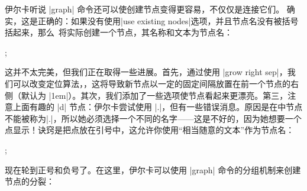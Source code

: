 伊尔卡听说 |graph| 命令还可以使创建节点变得更容易，不仅仅是连接它们。 确实，这是正确的：如果没有使用|use existing nodes|选项，并且节点名没有被括号括起来，那么\tikzname\ 将实际创建一个节点，其名称和文本为节点名：

%
\begin{codeexample}[preamble={\usetikzlibrary{graphs}}]
\tikz {};
\end{codeexample}
%

这并不太完美，但我们正在取得一些进展。首先，通过使用 |grow right sep|，我们可以改变定位算法，，这将导致新节点以一定的固定间隔放置在前一个节点的右侧（默认为 |1em|）。其次，我们添加了一些选项使节点看起来更漂亮。第三，注意上面有趣的 |d| 节点：伊尔卡尝试使用 |.|，但有一些错误消息。原因是在\tikzname 中节点不能被称为|.|，所以她必须选择一个不同的名字——这是不好的，因为她想要一个点显示！诀窍是把点放在引号中，这允许你使用``相当随意的文本''作为节点名：

%
\begin{codeexample}[preamble={\usetikzlibrary{graphs,shapes.misc}}]
\tikz {};
\end{codeexample}
%

现在轮到正号和负号了。在这里，伊尔卡可以使用 |graph| 命令的分组机制来创建节点的分裂：

